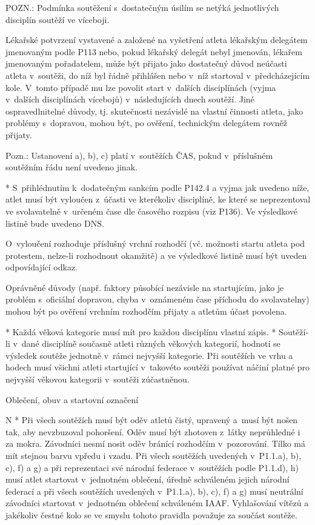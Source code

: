   POZN.: Podmínka soutěžení s~dostatečným úsilím se netýká jednotlivých disciplín soutěží ve víceboji.

  \enditems
Lékařské potvrzení vystavené a založené na vyšetření atleta lékařským delegátem jmenovaným podle P113 nebo, pokud lékařský delegát nebyl jmenován, lékařem jmenovaným pořadatelem, může být přijato jako dostatečný důvod neúčasti atleta v~soutěži, do níž byl řádně přihlášen nebo v~níž startoval v~předcházejícím kole. V~tomto případě mu lze povolit start v~dalších disciplínách (vyjma v~dalších disciplínách vícebojů) v~následujících dnech soutěží. Jiné ospravedlnitelné důvody, tj. skutečnosti nezávislé na vlastní činnosti atleta, jako problémy s~dopravou, mohou být, po ověření, technickým delegátem rovněž přijaty.

Pozn.: Ustanovení a), b), c) platí v~soutěžích ČAS, pokud v~příslušném soutěžním řádu není uvedeno jinak.

* S~přihlédnutím k~dodatečným sankcím podle P142.4 a vyjma jak uvedeno níže, atlet musí být vyloučen z~účasti ve kterékoliv disciplíně, ke které se neprezentoval ve svolavatelně v~určeném čase dle časového rozpisu (viz P136). Ve výsledkové listině bude uvedeno DNS.

O~vyloučení rozhoduje příslušný vrchní rozhodčí (vč. možnosti startu atleta pod protestem, nelze-li rozhodnout okamžitě) a ve výsledkové listině musí být uveden odpovídající odkaz.

Oprávněné důvody (např. faktory působící nezávisle na startujícím, jako je problém s~oficiální dopravou, chyba v~oznámeném čase příchodu do svolavatelny) mohou být po ověření vrchním rozhodčím přijaty a atletům účast povolena.

* Každá věková kategorie musí mít pro každou disciplínu vlastní zápis.
* Soutěží-li v~dané disciplíně současně atleti různých věkových kategorií, hodnotí se výsledek soutěže jednotně v~rámci nejvyšší kategorie. Při soutěžích ve vrhu a hodech musí všichni atleti startující v~takovéto soutěži používat náčiní platné pro nejvyšší věkovou kategorii v~soutěži zúčastněnou.
\enditems

\secc Oblečení, obuv a startovní označení

\begitems \style N
* Při všech soutěžích musí být oděv atletů čistý, upravený a~musí být nošen tak, aby nevzbuzoval pohoršení. Oděv musí být zhotoven z~látky neprůhledné i za mokra. Závodníci nesmí nosit oděv bránící rozhodčím v~pozorování. Tílko má mít stejnou barvu vpředu i vzadu. Při všech soutěžích uvedených v~P1.1.a), b), c), f) a g) a při reprezentaci své národní federace v~soutěžích podle P1.1.d), h) musí atlet startovat v~jednotném oblečení, úředně schváleném jejich národní federací a při všech soutěžích uvedených v~P1.1.a), b), c), f) a g) musí neutrální závodníci startovat v~jednotném oblečení schváleném IAAF. Vyhlašování vítězů a jakékoliv čestné kolo se ve smyslu tohoto pravidla považuje za součást soutěže.

